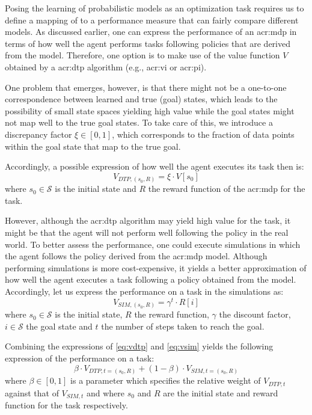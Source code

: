 Posing the learning of probabilistic models as an optimization task requires us to define a mapping of  to a performance measure that can fairly compare different models.
As discussed earlier, one can express the performance of an \acrshort{acr:mdp} in terms of how well the agent performs tasks following policies that are derived from the model.
Therefore, one option is to make use of the value function $V$ obtained by a \acrshort{acr:dtp} algorithm (e.g., \acrshort{acr:vi} or \acrshort{acr:pi}).

One problem that emerges, however, is that there might not be a one-to-one correspondence between learned and true (goal) states, which leads to the possibility of small state spaces yielding high value while the goal states might not map well to the true goal states.
To take care of this, we introduce a discrepancy factor $\xi \in [0, 1]$, which corresponds to the fraction of data points within the goal state that map to the true goal.

Accordingly, a possible expression of how well the agent executes its task then is:
\begin{equation}
\label{eq:vdtp}
V_{\mathit{DTP},(s_0,R)} = \xi \cdot V[s_0]
\end{equation}
where $s_0 \in \mathcal{S}$ is the initial state and $R$ the reward function of the \acrshort{acr:mdp} for the task.

However, although the \acrshort{acr:dtp} algorithm may yield high value for the task, it might be that the agent will not perform well following the policy in the real world.
To better assess the performance, one could execute simulations in which the agent follows the policy derived from the \acrshort{acr:mdp} model.
Although performing simulations is more cost-expensive, it yields a better approximation of how well the agent executes a task following a policy obtained from the model.
Accordingly, let us express the performance on a task in the simulations as:
\begin{equation}
\label{eq:vsim}
V_{\mathit{SIM}, (s_0, R)} = \gamma^{t} \cdot R[i]
\end{equation}
where $s_0 \in \mathcal{S}$ is the initial state, $R$ the reward function, $\gamma$ the discount factor, $i \in \mathcal{S}$ the goal state and $t$ the number of steps taken to reach the goal.

Combining the expressions of \autoref{eq:vdtp} and \autoref{eq:vsim} yields the following expression of the performance on a task:
\begin{equation}
\label{eq:vcom}
\beta \cdot V_{\mathit{DTP}, t=(s_0, R)} + (1 - \beta) \cdot V_{\mathit{SIM}, t=(s_0, R)}
\end{equation}
where $\beta \in [0, 1]$ is a parameter which specifies the relative weight of $V_{\mathit{DTP}, t}$ against that of $V_{\mathit{SIM}, t}$ and where $s_0$ and $R$ are the initial state and reward function for the task respectively.

